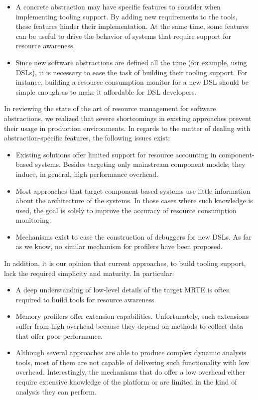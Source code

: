 \begin{itemize}
\item A concrete abstraction may have specific features to consider when implementing tooling support.
By adding new requirements to the tools, these features hinder their implementation.
At the same time, some features can be useful to drive the behavior of systems that require support for resource awareness.

\item Since new software abstractions are defined all the time (for example, using DSLs), it is necessary to ease the task of building their tooling support.
For instance, building a resource consumption monitor for a new DSL should be simple enough as to make it affordable for DSL developers.
\end{itemize}   

In reviewing the state of the art of resource management for software abstractions, we realized that severe shortcomings in existing approaches prevent their usage in production environments.
In regards to the matter of dealing with abstraction-specific features, the following issues exist:

\begin{itemize}
\item Existing solutions offer limited support for resource accounting in component-based systems.
Besides targeting only mainstream component models; they induce, in general, high performance overhead. 

\item Most approaches that target component-based systems use little information about the architecture of the systems.
In those cases where such knowledge is used, the goal is solely to improve the accuracy of resource consumption monitoring.

\item Mechanisms exist to ease the construction of debuggers for new DSLs.
As far as we know, no similar mechanism for profilers have been proposed.

\end{itemize}

In addition, it is our opinion that current approaches, to build tooling support, lack the required simplicity and maturity. In particular:

\begin{itemize}
\item A deep understanding of low-level details of the target MRTE is often required to build tools for resource awareness.

\item Memory profilers offer extension capabilities.
Unfortunately, such extensions suffer from high overhead because they depend on methods to collect data that offer poor performance.

\item Although several approaches are able to produce complex dynamic analysis tools, most of them are not capable of delivering such functionality with low overhead.
Interestingly, the mechanisms that do offer a low overhead either require extensive knowledge of the platform or are limited in the kind of analysis they can perform.
\end{itemize} 

%


